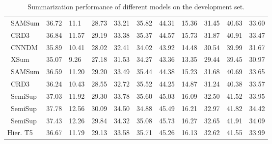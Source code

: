 \begin{savenotes}
\begin{table*}
\begin{center}
\begin{tabular}{lllllllllll}
\ SAMSum & 36.72 & 11.1 & 28.73 & 33.21 & 35.82 & 44.31 & 15.36 & 31.45 & 40.63 & 33.60  \\
\ CRD3 &  36.84 & 11.57 & 29.19 & 33.38 & 35.37 & 44.57 & 15.73 & 31.87 & 40.91 & 33.47   \\
\cmidrule(lr){1-1}
\ CNNDM & 35.89 & 10.41 & 28.02 & 32.41 & 34.02 & 43.92 & 14.48 & 30.54 & 39.99 & 31.67 \\
\ XSum & 35.07 & 9.26 & 27.18 & 31.53 & 34.27 & 43.36 & 13.35 & 29.44 & 39.45 & 30.97 \\
\ SAMSum & 36.59 & 11.20 & 29.20 & 33.49 & 35.44 & 44.38 & 15.23 & 31.68 & 40.69 & 33.65 \\
\ CRD3 & 36.24 & 10.43 & 28.55 & 32.72 & 35.52 & 44.25 & 14.87 & 31.24 & 40.38 & 33.57  \\
\cmidrule(lr){1-1}
\ SemiSup & 37.03 & 11.92 & 29.30 & 33.78 & 35.60 & 45.03 & 16.09 & 32.50 & 41.52 & 33.95 \\
\ SemiSup & 37.78 & 12.56 & 30.09 & 34.50 & 34.88 & 45.49 & 16.21 & 32.97 & 41.82 & 34.42 \\
\ SemiSup & 37.43 & 12.26 & 29.84 & 34.32 & 35.08 & 45.73 & 16.27 & 32.65 & 41.91 & 34.09 \\
\cmidrule(lr){1-1}
Hier. T5 & 36.67 & 11.79 & 29.13 & 33.58 & 35.71 & 45.26 & 16.13 & 32.62 & 41.55 & 33.99 \\
\toprule
\end{tabular}
\end{center}
\vspace{-12pt}
\caption{Summarization performance of different models on the development set.}
\label{tab:dev}
\vspace{-12pt}
\end{table*}
\end{savenotes}


